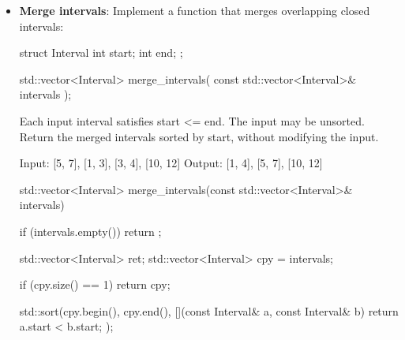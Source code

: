 \documentclass{report}
\begin{document}
\begin{itemize}
\begin{cppcode}
                bool RingBuffer::full() const noexcept {
                    return size_ == capacity_;
                }
            \end{cppcode}
            \bigbreak \noindent 
            \begin{cppcode}
                void RingBuffer::print() const {
                    std::size_t idx = read_;

                    for (size_t i{0}; i < size_; ++i) {
                        if (i != 0) std::cout << ", ";
                        std::cout << buf_[idx];
                        idx = (idx + 1) %
                    }

                    std::cout << "\n";
                }
            \end{cppcode}

        \item \textbf{Merge intervals}: Implement a function that merges overlapping closed intervals:
            \bigbreak \noindent 
            \begin{cppcode}
                struct Interval {
                    int start;
                    int end;
                };

                std::vector<Interval> merge_intervals(
                const std::vector<Interval>& intervals
                );
            \end{cppcode}
            \bigbreak \noindent 
            Each input interval satisfies start <= end. The input may be unsorted. Return the merged intervals sorted by start, without modifying the input.
            \bigbreak \noindent 
            \begin{cppcode}
                Input:  [5, 7], [1, 3], [3, 4], [10, 12]
                Output: [1, 4], [5, 7], [10, 12]
            \end{cppcode}
            \bigbreak \noindent 
            \begin{cppcode}
            std::vector<Interval> merge_intervals(const std::vector<Interval>& intervals) {
                if (intervals.empty()) return {};

                std::vector<Interval> ret;
                std::vector<Interval> cpy = intervals;

                if (cpy.size() == 1) return cpy;

                std::sort(cpy.begin(), cpy.end(), [](const Interval& a, const Interval& b) {
                    return a.start < b.start;
                });

}
\end{cppcode}
\end{itemize}
\end{document}
